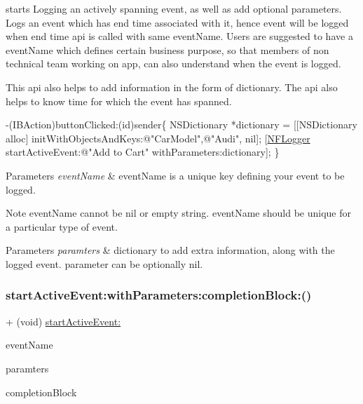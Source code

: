 starts Logging an actively spanning event, as well as add optional parameters. Logs an event which has end time associated with it, hence event will be logged when end time api is called with same event\+Name. Users are suggested to have a event\+Name which defines certain business purpose, so that members of non technical team working on app, can also understand when the event is logged. 

This api also helps to add information in the form of dictionary. The api also helps to know time for which the event has spanned.


\begin{DoxyCode}
-(IBAction)buttonClicked:(\textcolor{keywordtype}{id})sender\{
 NSDictionary *dictionary = [[NSDictionary alloc] initWithObjectsAndKeys:\textcolor{stringliteral}{@"CarModel"},\textcolor{stringliteral}{@"Audi"}, nil];
 [\hyperlink{interface_n_f_logger}{NFLogger} startActiveEvent:\textcolor{stringliteral}{@"Add to Cart"} withParameters:dictionary];
\}
\end{DoxyCode}
 
\begin{DoxyParams}{Parameters}
{\em event\+Name} & event\+Name is a unique key defining your event to be logged. \\
\hline
\end{DoxyParams}
\begin{DoxyNote}{Note}
event\+Name cannot be nil or empty string. event\+Name should be unique for a particular type of event. 
\end{DoxyNote}

\begin{DoxyParams}{Parameters}
{\em paramters} & dictionary to add extra information, along with the logged event. parameter can be optionally nil. \\
\hline
\end{DoxyParams}
\mbox{\label{interface_n_f_logger_a943cd3b2d89a9b40f9bb2540d8fcd190}} 
\subsubsection{\texorpdfstring{start\+Active\+Event\+:with\+Parameters\+:completion\+Block\+:()}{startActiveEvent:withParameters:completionBlock:()}}
{\footnotesize\ttfamily + (void) \hyperlink{interface_n_f_logger_a2d98749d91d892500fab101747d06a71}{start\+Active\+Event\+:} \begin{DoxyParamCaption}\item[{(N\+S\+String $\ast$)}]{event\+Name }\item[{withParameters:(N\+S\+Dictionary $\ast$)}]{paramters }\item[{completionBlock:(void($^\wedge$)(N\+F\+L\+O\+G\+Record\+Status record\+Status))}]{completion\+Block }\end{DoxyParamCaption}}



